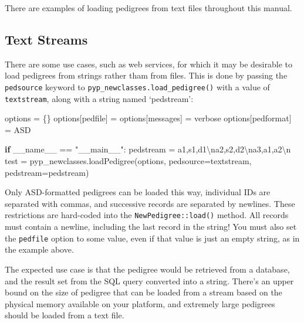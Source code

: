 \documentclass[
  letterpaper,
  DIV=11,
  numbers=noendperiod]{scrreprt}
\newenvironment{Shaded}{\begin{snugshade}}{\end{snugshade}}
\newcommand{\CharTok}[1]{\textcolor[rgb]{0.13,0.47,0.30}{#1}}
\newcommand{\ControlFlowTok}[1]{\textcolor[rgb]{0.00,0.23,0.31}{\textbf{#1}}}
\newcommand{\NormalTok}[1]{\textcolor[rgb]{0.00,0.23,0.31}{#1}}
\newcommand{\OperatorTok}[1]{\textcolor[rgb]{0.37,0.37,0.37}{#1}}
\newcommand{\StringTok}[1]{\textcolor[rgb]{0.13,0.47,0.30}{#1}}
\newcommand{\VariableTok}[1]{\textcolor[rgb]{0.07,0.07,0.07}{#1}}
\begin{document}
There are examples of loading pedigrees from text files throughout this
manual.

\subsection{Text Streams}\label{text-streams}

There are some use cases, such as web services, for which it may be
desirable to load pedigrees from strings rather tham from files. This is
done by passing the \texttt{pedsource} keyword to
\texttt{pyp\_newclasses.load\_pedigree()} with a value of
\texttt{textstream}, along with a string named `pedstream':

\begin{Shaded}
\begin{Highlighting}[]
\NormalTok{options }\OperatorTok{=}\NormalTok{ \{\}}
\NormalTok{options[}\StringTok{\textquotesingle{}pedfile\textquotesingle{}}\NormalTok{] }\OperatorTok{=} \StringTok{\textquotesingle{}\textquotesingle{}}
\NormalTok{options[}\StringTok{\textquotesingle{}messages\textquotesingle{}}\NormalTok{] }\OperatorTok{=} \StringTok{\textquotesingle{}verbose\textquotesingle{}}
\NormalTok{options[}\StringTok{\textquotesingle{}pedformat\textquotesingle{}}\NormalTok{] }\OperatorTok{=} \StringTok{\textquotesingle{}ASD\textquotesingle{}}

\ControlFlowTok{if} \VariableTok{\_\_name\_\_} \OperatorTok{==} \StringTok{"\_\_main\_\_"}\NormalTok{:}
\NormalTok{    pedstream }\OperatorTok{=} \StringTok{\textquotesingle{}a1,s1,d1}\CharTok{\textbackslash{}n}\StringTok{a2,s2,d2}\CharTok{\textbackslash{}n}\StringTok{a3,a1,a2}\CharTok{\textbackslash{}n}\StringTok{\textquotesingle{}}
\NormalTok{    test }\OperatorTok{=}\NormalTok{ pyp\_newclasses.loadPedigree(options, pedsource}\OperatorTok{=}\StringTok{\textquotesingle{}textstream\textquotesingle{}}\NormalTok{, pedstream}\OperatorTok{=}\NormalTok{pedstream)}
\end{Highlighting}
\end{Shaded}

Only ASD-formatted pedigrees can be loaded this way, individual IDs are
separated with commas, and successive records are separated by newlines.
These restrictions are hard-coded into the \texttt{NewPedigree::load()}
method. All records must contain a newline, including the last record in
the string! You must also set the \texttt{pedfile} option to some value,
even if that value is just an empty string, as in the example above.

The expected use case is that the pedigree would be retrieved from a
database, and the result set from the SQL query converted into a string.
There's an upper bound on the size of pedigree that can be loaded from a
stream based on the physical memory available on your platform, and
extremely large pedigrees should be loaded from a text file.
\end{document}
